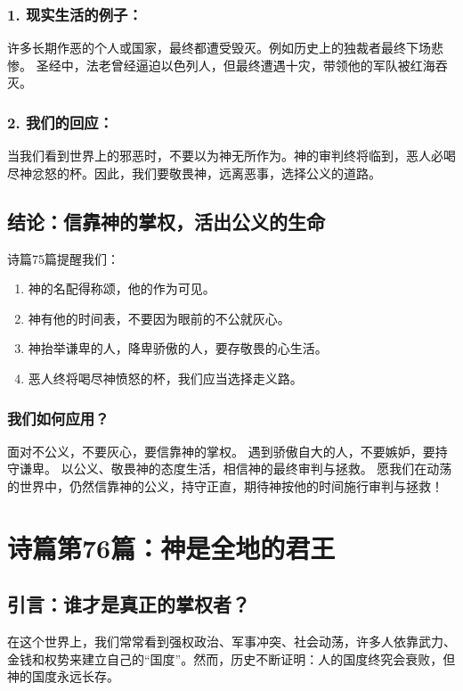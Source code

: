 \documentclass[a4paper, 12pt]{article}
\begin{document}
\subsubsection*{1. 现实生活的例子：}
许多长期作恶的个人或国家，最终都遭受毁灭。例如历史上的独裁者最终下场悲惨。
圣经中，法老曾经逼迫以色列人，但最终遭遇十灾，带领他的军队被红海吞灭。
\subsubsection*{2. 我们的回应：}
当我们看到世界上的邪恶时，不要以为神无所作为。神的审判终将临到，恶人必喝尽神忿怒的杯。因此，我们要敬畏神，远离恶事，选择公义的道路。
\subsection*{结论：信靠神的掌权，活出公义的生命}
诗篇75篇提醒我们：
\begin{enumerate}
    \item 神的名配得称颂，他的作为可见。

    \item 神有他的时间表，不要因为眼前的不公就灰心。

    \item 神抬举谦卑的人，降卑骄傲的人，要存敬畏的心生活。

    \item 恶人终将喝尽神愤怒的杯，我们应当选择走义路。

\end{enumerate}
\subsubsection*{我们如何应用？}
面对不公义，不要灰心，要信靠神的掌权。
遇到骄傲自大的人，不要嫉妒，要持守谦卑。
以公义、敬畏神的态度生活，相信神的最终审判与拯救。
愿我们在动荡的世界中，仍然信靠神的公义，持守正直，期待神按他的时间施行审判与拯救！
\newpage
\section{诗篇第76篇：神是全地的君王}
\subsection*{引言：谁才是真正的掌权者？}
\hspace{0.6cm}在这个世界上，我们常常看到强权政治、军事冲突、社会动荡，许多人依靠武力、金钱和权势来建立自己的“国度”。然而，历史不断证明：人的国度终究会衰败，但神的国度永远长存。
\end{document}
